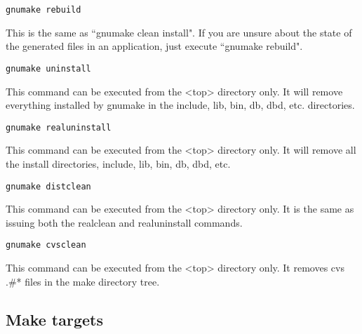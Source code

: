 \begin{description}
\item 

\end{description}\begin{verbatim}gnumake rebuild 
\end{verbatim}\begin{description}\item This is the same as ``gnumake clean install". If you are unsure about the state of the generated files in an 
application, just execute ``gnumake rebuild".

\item 

\end{description}\begin{verbatim}gnumake uninstall
\end{verbatim}\begin{description}\item This command can be executed from the \textless{}top\textgreater{} directory only. It will remove everything installed by gnumake in 
the include, lib, bin, db, dbd, etc. directories.

\item 

\end{description}\begin{verbatim}gnumake realuninstall
\end{verbatim}\begin{description}\item This command can be executed from the \textless{}top\textgreater{} directory only. It will remove all the install directories, include, lib, 
bin, db, dbd, etc.

\item 

\end{description}\begin{verbatim}gnumake distclean
\end{verbatim}\begin{description}\item This command can be executed from the \textless{}top\textgreater{} directory only. It is the same as issuing both the realclean and 
realuninstall commands.

\item 

\end{description}\begin{verbatim}gnumake cvsclean
\end{verbatim}\begin{description}\item This command can be executed from the \textless{}top\textgreater{} directory only. It removes cvs .\#* files in the make directory tree.

\end{description}\subsection{Make targets}

